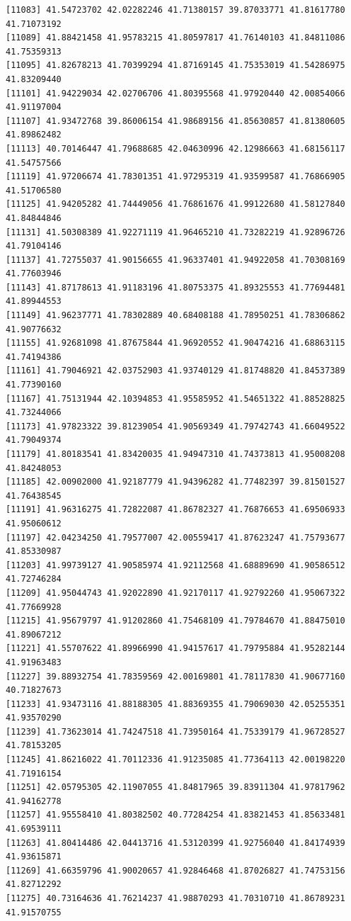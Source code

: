 \documentclass[
  letterpaper,
  DIV=11,
  numbers=noendperiod]{scrartcl}
\begin{document}
\begin{verbatim}
[11083] 41.54723702 42.02282246 41.71380157 39.87033771 41.81617780 41.71073192
[11089] 41.88421458 41.95783215 41.80597817 41.76140103 41.84811086 41.75359313
[11095] 41.82678213 41.70399294 41.87169145 41.75353019 41.54286975 41.83209440
[11101] 41.94229034 42.02706706 41.80395568 41.97920440 42.00854066 41.91197004
[11107] 41.93472768 39.86006154 41.98689156 41.85630857 41.81380605 41.89862482
[11113] 40.70146447 41.79688685 42.04630996 42.12986663 41.68156117 41.54757566
[11119] 41.97206674 41.78301351 41.97295319 41.93599587 41.76866905 41.51706580
[11125] 41.94205282 41.74449056 41.76861676 41.99122680 41.58127840 41.84844846
[11131] 41.50308389 41.92271119 41.96465210 41.73282219 41.92896726 41.79104146
[11137] 41.72755037 41.90156655 41.96337401 41.94922058 41.70308169 41.77603946
[11143] 41.87178613 41.91183196 41.80753375 41.89325553 41.77694481 41.89944553
[11149] 41.96237771 41.78302889 40.68408188 41.78950251 41.78306862 41.90776632
[11155] 41.92681098 41.87675844 41.96920552 41.90474216 41.68863115 41.74194386
[11161] 41.79046921 42.03752903 41.93740129 41.81748820 41.84537389 41.77390160
[11167] 41.75131944 42.10394853 41.95585952 41.54651322 41.88528825 41.73244066
[11173] 41.97823322 39.81239054 41.90569349 41.79742743 41.66049522 41.79049374
[11179] 41.80183541 41.83420035 41.94947310 41.74373813 41.95008208 41.84248053
[11185] 42.00902000 41.92187779 41.94396282 41.77482397 39.81501527 41.76438545
[11191] 41.96316275 41.72822087 41.86782327 41.76876653 41.69506933 41.95060612
[11197] 42.04234250 41.79577007 42.00559417 41.87623247 41.75793677 41.85330987
[11203] 41.99739127 41.90585974 41.92112568 41.68889690 41.90586512 41.72746284
[11209] 41.95044743 41.92022890 41.92170117 41.92792260 41.95067322 41.77669928
[11215] 41.95679797 41.91202860 41.75468109 41.79784670 41.88475010 41.89067212
[11221] 41.55707622 41.89966990 41.94157617 41.79795884 41.95282144 41.91963483
[11227] 39.88932754 41.78359569 42.00169801 41.78117830 41.90677160 40.71827673
[11233] 41.93473116 41.88188305 41.88369355 41.79069030 42.05255351 41.93570290
[11239] 41.73623014 41.74247518 41.73950164 41.75339179 41.96728527 41.78153205
[11245] 41.86216022 41.70112336 41.91235085 41.77364113 42.00198220 41.71916154
[11251] 42.05795305 42.11907055 41.84817965 39.83911304 41.97817962 41.94162778
[11257] 41.95558410 41.80382502 40.77284254 41.83821453 41.85633481 41.69539111
[11263] 41.80414486 42.04413716 41.53120399 41.92756040 41.84174939 41.93615871
[11269] 41.66359796 41.90020657 41.92846468 41.87026827 41.74753156 41.82712292
[11275] 40.73164636 41.76214237 41.98870293 41.70310710 41.86789231 41.91570755

\end{verbatim}
\end{document}
